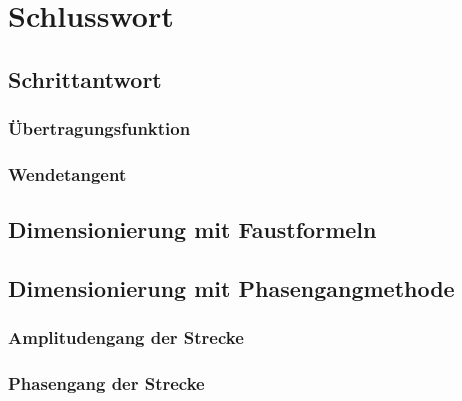 \section{Schlusswort}
\subsection{Schrittantwort}
\subsubsection{Übertragungsfunktion}
\subsubsection{Wendetangent}
\subsection{Dimensionierung mit Faustformeln}
\subsection{Dimensionierung mit  Phasengangmethode}
\subsubsection{Amplitudengang der Strecke}
\subsubsection{Phasengang der Strecke}